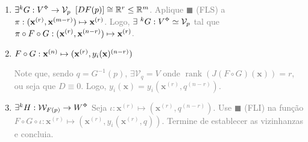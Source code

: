 \begin{enumerate}[left = 0cm]

\item[] \begin{tcolorbox}[colframe=gray, colback=white, boxrule = 0.8pt] 
\centering \textcolor{black}{\(\exists ^k G: V\ab \to \mathcal{V}_p\)}
\tcblower
\textcolor{gray}{\([DF(p)]\cong \mathbb{R}^r\leq \mathbb{R}^m\). Aplique \(\blacksquare\) (FLS) a \(\pi:(\textbf{x}^{(r)},\textbf{x}^{(m-r)}) \mapsto \textbf{x}^{(r)}\). Logo, \(\exists \ ^k G: V\ab\simeq \mathcal{V}_p\) tal que \(\pi\circ F\circ G:(\textbf{x}^{(r)}, \textbf{x}^{(n-r)}) \mapsto \textbf{x}^{(r)}\).}
\end{tcolorbox}

\item[] \begin{tcolorbox}[colframe=gray, colback=white, boxrule = 0.8pt] 
  \centering \(F\circ G: \textbf{x}^{(n)}\mapsto (\textbf{x}^{(r)}, y_i(\textbf{x})^{(n-r)}) \)
  \tcblower 
\parbox[a]{0.85\linewidth}{\textcolor{gray}{Note que, sendo \(q = G^{-1}(p)\), \(\exists \mathcal{V}_q= V\) onde \(\operatorname{rank}(J(F\circ G)(\textbf{x}))=r\), ou seja que \(D\equiv 0\). Logo, \(y_i(\textbf{x}) = y_i(\textbf{x}^{(r)}, q^{(n-r)})\). 
}\vspace{-0cm}}
\parbox[b]{0.15\linewidth}{  }
\end{tcolorbox}


\vspace{-1cm}

\item[]\begin{tcolorbox}[colframe=gray, colback=white, boxrule = 0.8pt] 
  \centering \(\exists ^k H : \mathcal{W}_{F(p)} \to W\ab\)
  \tcblower
  \textcolor{gray}{
  Seja \(\iota: \textbf{x}^{(r)} \mapsto (\textbf{x}^{(r)}, q^{(n-r)})\). Use \(\blacksquare\) (FLI) na função 
  \(F\circ G\circ \iota : \textbf{x}^{(r)} \mapsto (\textbf{x}^{(r)}, y_i(\textbf{x}^{(r)},q))\). Termine de establecer as vizinhanzas e concluia. }
\end{tcolorbox}

\end{enumerate}

